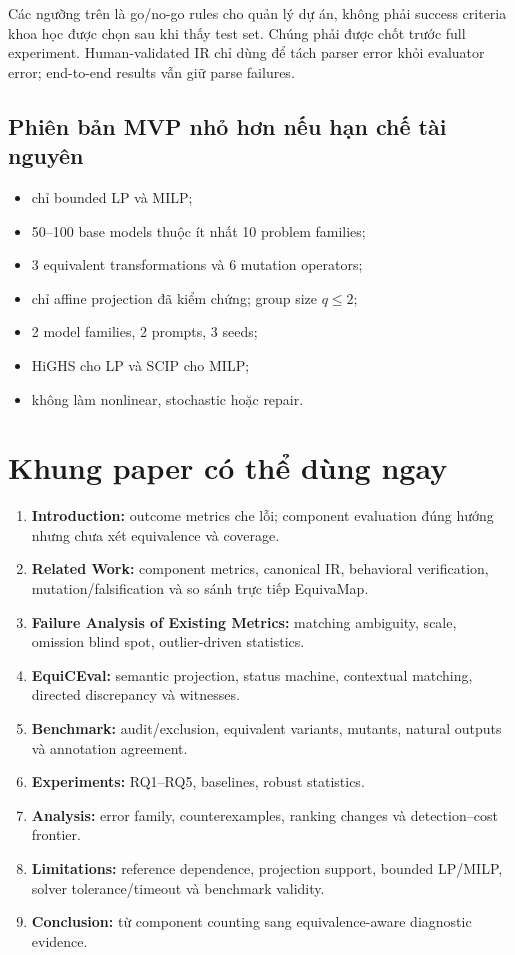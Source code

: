 \documentclass[11pt,a4paper]{article}
\newcommand{\method}{\textsf{\textbf{EquiCEval}}\xspace}
\begin{document}
Các ngưỡng trên là go/no-go rules cho quản lý dự án, không phải success
criteria khoa học được chọn sau khi thấy test set. Chúng phải được chốt trước
full experiment. Human-validated IR chỉ dùng để tách parser error khỏi evaluator
error; end-to-end results vẫn giữ parse failures.

\subsection{Phiên bản MVP nhỏ hơn nếu hạn chế tài nguyên}

\begin{itemize}
  \item chỉ bounded LP và MILP;
  \item 50--100 base models thuộc ít nhất 10 problem families;
  \item 3 equivalent transformations và 6 mutation operators;
  \item chỉ affine projection đã kiểm chứng; group size \(q\leq2\);
  \item 2 model families, 2 prompts, 3 seeds;
  \item HiGHS cho LP và SCIP cho MILP;
  \item không làm nonlinear, stochastic hoặc repair.
\end{itemize}

\section{Khung paper có thể dùng ngay}

\begin{enumerate}
  \item \textbf{Introduction:} outcome metrics che lỗi; component evaluation
  đúng hướng nhưng chưa xét equivalence và coverage.
  \item \textbf{Related Work:} component metrics, canonical IR, behavioral
  verification, mutation/falsification và so sánh trực tiếp EquivaMap.
  \item \textbf{Failure Analysis of Existing Metrics:} matching ambiguity,
  scale, omission blind spot, outlier-driven statistics.
  \item \textbf{\method:} semantic projection, status machine, contextual
  matching, directed discrepancy và witnesses.
  \item \textbf{Benchmark:} audit/exclusion, equivalent variants, mutants,
  natural outputs và annotation agreement.
  \item \textbf{Experiments:} RQ1--RQ5, baselines, robust statistics.
  \item \textbf{Analysis:} error family, counterexamples, ranking changes và
  detection--cost frontier.
  \item \textbf{Limitations:} reference dependence, projection support, bounded
  LP/MILP, solver tolerance/timeout và benchmark validity.
  \item \textbf{Conclusion:} từ component counting sang
  equivalence-aware diagnostic evidence.
\end{enumerate}
\end{document}
